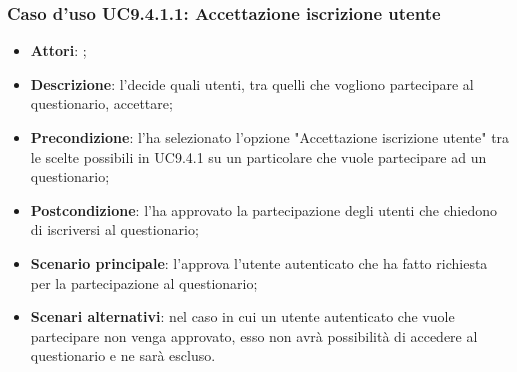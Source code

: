 			 \subsubsection{Caso d'uso UC9.4.1.1: Accettazione iscrizione utente}
			 \label{UC9.4.1.1}
			 \begin{itemize}
			 	\item \textbf{Attori}: \uaupro;
			 	\item \textbf{Descrizione}: l'\uaupro decide quali utenti, tra quelli che vogliono partecipare al questionario, accettare; 
			 	\item \textbf{Precondizione}: l'\uaupro ha selezionato l'opzione "Accettazione iscrizione utente" tra le scelte possibili in UC9.4.1 su un particolare \uaupro che vuole partecipare ad un questionario;
			 	\item \textbf{Postcondizione}: l'\uaupro ha approvato la partecipazione degli utenti che chiedono di iscriversi al questionario;
			 	\item \textbf{Scenario principale}: l'\uaupro approva l'utente autenticato che ha fatto richiesta per la partecipazione al questionario; 
			 	\item \textbf{Scenari alternativi}: nel caso in cui un utente autenticato che vuole partecipare non venga approvato, esso non avrà possibilità di accedere al questionario e ne sarà escluso.
			 \end{itemize}
			
				